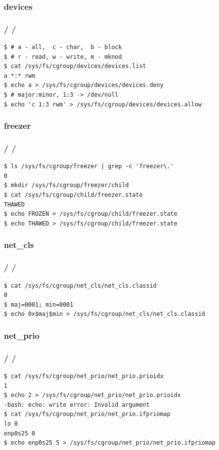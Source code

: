 \documentclass{beamer}
\newcommand{\autotitle}
{\frametitle{
    \secname
    \ifx\insertsubsection\empty
    \else
        /\subsecname
        \ifx\insertsubsubsection\empty\else/\subsubsecname\fi
    \fi}}
\begin{document}
\subsubsection{devices}

\begin{frame}[fragile]
    \autotitle
    \begin{verbatim}
$ # a - all,  c - char,  b - block
$ # r - read, w - write, m - mknod
$ cat /sys/fs/cgroup/devices/devices.list
a *:* rwm
$ echo a > /sys/fs/cgroup/devices/devices.deny
$ # major:minor, 1:3 -> /dev/null
$ echo 'c 1:3 rwm' > /sys/fs/cgroup/devices/devices.allow
    \end{verbatim}
\end{frame}

\subsubsection{freezer}

\begin{frame}[fragile]
    \autotitle
    \begin{verbatim}
$ ls /sys/fs/cgroup/freezer | grep -c 'freezer\.'
0
$ mkdir /sys/fs/cgroup/freezer/child
$ cat /sys/fs/cgroup/child/freezer.state
THAWED
$ echo FROZEN > /sys/fs/cgroup/child/freezer.state
$ echo THAWED > /sys/fs/cgroup/child/freezer.state
    \end{verbatim}
\end{frame}

\subsubsection{net\_cls}

\begin{frame}[fragile]
    \autotitle
    \begin{verbatim}
$ cat /sys/fs/cgroup/net_cls/net_cls.classid
0
$ maj=0001; min=0001
$ echo 0x$maj$min > /sys/fs/cgroup/net_cls/net_cls.classid
    \end{verbatim}
\end{frame}

\subsubsection{net\_prio}

\begin{frame}[fragile]
    \autotitle
    \begin{verbatim}
$ cat /sys/fs/cgroup/net_prio/net_prio.prioidx
1
$ echo 2 > /sys/fs/cgroup/net_prio/net_prio.prioidx
-bash: echo: write error: Invalid argument
$ cat /sys/fs/cgroup/net_prio/net_prio.ifpriomap
lo 0
enp0s25 0
$ echo enp0s25 5 > /sys/fs/cgroup/net_prio/net_prio.ifpriomap
    \end{verbatim}
\end{frame}
\end{document}
